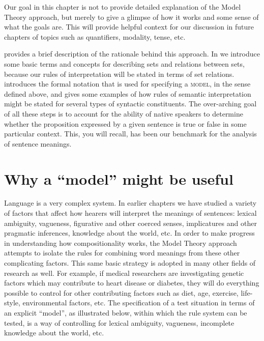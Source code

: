 Our goal in this chapter is not to provide detailed explanation of the Model Theory approach, but merely to give a glimpse of how it works and some sense of what the goals are. This will provide helpful context for our discussion in future chapters of topics such as quantifiers, modality, tense, etc.



 provides a brief description of the rationale behind this approach. In  we introduce some basic terms and concepts for describing sets and relations between sets, because our rules of interpretation will be stated in terms of set relations.  introduces the formal notation that is used for specifying a \textsc{model}, in the sense defined above, and  gives some examples of how rules of semantic interpretation might be stated for several types of syntactic constituents. The over-arching goal of all these steps is to account for the ability of native speakers to determine whether the proposition expressed by a given sentence is true or false in some particular context. This, you will recall, has been our benchmark for the analysis of sentence meanings.


\section{Why a “model” might be useful}\label{sec:13.2}

Language is a very complex system. In earlier chapters we have studied a variety of factors that affect how hearers will interpret the meanings of sentences: lexical ambiguity, vagueness, figurative and other coerced senses, implicatures and other pragmatic inferences, knowledge about the world, etc. In order to make progress in understanding how compositionality works, the Model Theory approach attempts to isolate the rules for combining word meanings from these other complicating factors. This same basic strategy is adopted in many other fields of research as well. For example, if medical researchers are investigating genetic factors which may contribute to heart disease or diabetes, they will do everything possible to control for other contributing factors such as diet, age, exercise, life-style, environmental factors, etc. The specification of a test situation in terms of an explicit “model”, as illustrated below, within which the rule system can be tested, is a way of controlling for lexical ambiguity, vagueness, incomplete knowledge about the world, etc.




